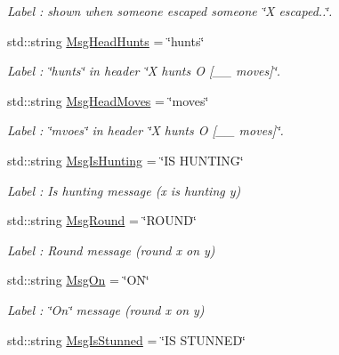 \begin{DoxyCompactItemize}
\begin{DoxyCompactList}\small\item\em Label \-: shown when someone escaped someone \char`\"{}\-X escaped..\char`\"{}. \end{DoxyCompactList}\item 
std\-::string \hyperlink{struct_chase_game_1_1_s_lang_strings_ae50e2fb23b58db21d1e9eeae0724a480}{Msg\-Head\-Hunts} = \char`\"{}hunts\char`\"{}
\begin{DoxyCompactList}\small\item\em Label \-: \char`\"{}hunts\char`\"{} in header \char`\"{}\-X hunts O \mbox{[}\-\_\-\-\_\- moves\mbox{]}\char`\"{}. \end{DoxyCompactList}\item 
std\-::string \hyperlink{struct_chase_game_1_1_s_lang_strings_a06fad00de9d27f4b289c01728ab55be1}{Msg\-Head\-Moves} = \char`\"{}moves\char`\"{}
\begin{DoxyCompactList}\small\item\em Label \-: \char`\"{}mvoes\char`\"{} in header \char`\"{}\-X hunts O \mbox{[}\-\_\-\-\_\- moves\mbox{]}\char`\"{}. \end{DoxyCompactList}\item 
std\-::string \hyperlink{struct_chase_game_1_1_s_lang_strings_ae186b81b6002ed3e2d795e5adecca95e}{Msg\-Is\-Hunting} = \char`\"{}I\-S H\-U\-N\-T\-I\-N\-G\char`\"{}
\begin{DoxyCompactList}\small\item\em Label \-: Is hunting message (x is hunting y) \end{DoxyCompactList}\item 
std\-::string \hyperlink{struct_chase_game_1_1_s_lang_strings_a637a94fa33b573cec57d98e6855c823f}{Msg\-Round} = \char`\"{}R\-O\-U\-N\-D\char`\"{}
\begin{DoxyCompactList}\small\item\em Label \-: Round message (round x on y) \end{DoxyCompactList}\item 
std\-::string \hyperlink{struct_chase_game_1_1_s_lang_strings_af30da50d583af601645117d472aace34}{Msg\-On} = \char`\"{}O\-N\char`\"{}
\begin{DoxyCompactList}\small\item\em Label \-: \char`\"{}\-On\char`\"{} message (round x on y) \end{DoxyCompactList}\item 
std\-::string \hyperlink{struct_chase_game_1_1_s_lang_strings_a971954b51dcf006eb0ff2291be037a5c}{Msg\-Is\-Stunned} = \char`\"{}I\-S S\-T\-U\-N\-N\-E\-D\char`\"{}

\end{DoxyCompactItemize}
